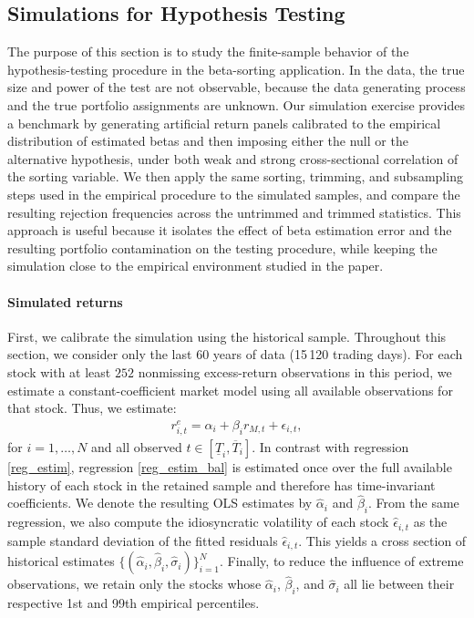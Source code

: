 \subsection{Simulations for Hypothesis Testing}
\label{Simulations for Hypothesis Testing}

The purpose of this section is to study the finite-sample behavior of the hypothesis-testing procedure in the beta-sorting application. In the data, the true size and power of the test are not observable, because the data generating process and the true portfolio assignments are unknown. Our simulation exercise provides a benchmark by generating artificial return panels calibrated to the empirical distribution of estimated betas and then imposing either the null or the alternative hypothesis, under both weak and strong cross-sectional correlation of the sorting variable. We then apply the same sorting, trimming, and subsampling steps used in the empirical procedure to the simulated samples, and compare the resulting rejection frequencies across the untrimmed and trimmed statistics. This approach is useful because it isolates the effect of beta estimation error and the resulting portfolio contamination on the testing procedure, while keeping the simulation close to the empirical environment studied in the paper.


\paragraph{Simulated returns} First, we calibrate the simulation using the historical sample. Throughout this section, we consider only the last $60$ years of data (15\,120 trading days). For each stock with at least $252$ nonmissing excess-return observations in this period, we estimate a constant-coefficient market model using all available observations for that stock. Thus, we estimate:
\begin{align}
\label{reg_estim_bal}
r_{i,t}^e = \alpha_i + \beta_i r_{M,t} + \epsilon_{i,t},
\end{align}
for $i=1,\dots,N$ and all observed $t \in [\underline{T}_i,\overline{T}_i]$. In contrast with regression \eqref{reg_estim}, regression \eqref{reg_estim_bal} is estimated once over the full available history of each stock in the retained sample and therefore has time-invariant coefficients. We denote the resulting OLS estimates by $\widehat{\alpha}_i$ and $\widehat{\beta}_i$. From the same regression, we also compute the idiosyncratic volatility of each stock $\widehat{\epsilon}_{i,t}$ as the sample standard deviation of the fitted residuals $\widehat{\epsilon}_{i,t}$. This yields a cross section of historical estimates $\{(\widehat{\alpha}_i,\widehat{\beta}_i,\widehat{\sigma}_i)\}_{i=1}^N$. Finally, to reduce the influence of extreme observations, we retain only the stocks whose $\widehat{\alpha}_i$, $\widehat{\beta}_i$, and $\widehat{\sigma}_i$ all lie between their respective 1st and 99th empirical percentiles.

